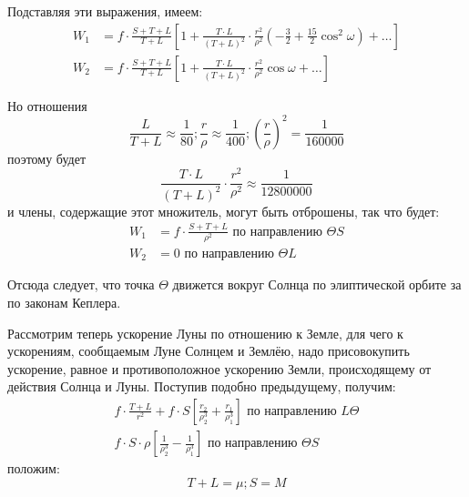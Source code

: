\documentclass[a4paper,12pt]{article}
\begin{document}
    Подставляя эти выражения, имеем:
    \begin{equation*}
        \begin{aligned}
            W_1 &= f \cdot \frac{S + T + L}{T + L} \left[1 + \frac{T \cdot L}{\left(T + L \right)^2} \cdot \frac{r^2}{\rho^2} \left(- \frac{3}{2} + \frac{15}{2} \cos^2{\omega} \right) + \dots \right] \\
            W_2 &= f \cdot \frac{S + T + L}{T + L} \left[1 + \frac{T \cdot L}{\left(T + L \right)^2} \cdot \frac{r^2}{\rho^2} \cos{\omega} + \dots \right]
        \end{aligned}
    \end{equation*}

    Но отношения
    \[\frac{L}{T + L} \approx \frac{1}{80}; \frac{r}{\rho} \approx \frac{1}{400}; \left(\frac{r}{\rho} \right)^2 = \frac{1}{160000} \]
    поэтому будет
    \[\frac{T \cdot L}{\left(T + L \right)^2} \cdot \frac{r^2}{\rho^2} \approx \frac{1}{12800000} \]
    и члены, содержащие этот множитель, могут быть отброшены, так что будет:
    \begin{equation*}
        \begin{aligned}
            W_1 &= f \cdot \frac{S + T + L}{\rho^2} \text{ по направлению } \Theta S \\
            W_2 &= 0 \text{ по направлению } \Theta L
        \end{aligned}
    \end{equation*}

    Отсюда следует, что точка $\Theta$ движется вокруг Солнца по элиптической орбите за по законам Кеплера.

    Рассмотрим теперь ускорение Луны по отношению к Земле, для чего к ускорениям, сообщаемым Луне Солнцем и Землёю, надо присовокупить ускорение, равное и противоположное ускорению Земли, происходящему от действия Солнца и Луны. Поступив подобно предыдущему, получим:
    \begin{equation*}
        \begin{aligned}
            f \cdot \frac{T + L}{r^2} + f \cdot S \left[\frac{r_2}{\rho_2^3} + \frac{r_1}{\rho_1^3} \right] \text{ по направлению } L \Theta \\
            f \cdot S \cdot \rho \left[\frac{1}{\rho_2^3} - \frac{1}{\rho_1^3} \right] \text{ по направлению } \Theta S
        \end{aligned}
    \end{equation*}
    положим:
    \[T + L = \mu ; S = M \]

    \listoftables

    \listoffigures
\end{document}
